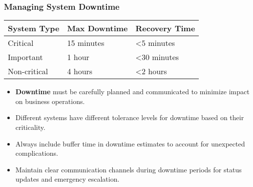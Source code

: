 \documentclass{beamer}
\begin{document}
            \begin{frame}
            \frametitle{Managing System Downtime}
            \begin{table}
            \begin{tabular}{lll}
            \toprule
            \textbf{System Type} & \textbf{Max Downtime} & \textbf{Recovery Time} \\
            \midrule
            Critical & 15 minutes & \textless 5 minutes \\
            Important & 1 hour & \textless 30 minutes \\
            Non-critical & 4 hours & \textless 2 hours \\
            \bottomrule
            \end{tabular}
            \end{table}
            \begin{itemize}
                \item \textbf{Downtime} must be carefully planned and communicated to minimize impact on business operations.
                
                \item Different systems have different tolerance levels for downtime based on their criticality.
                
                \item Always include buffer time in downtime estimates to account for unexpected complications.
                
                \item Maintain clear communication channels during downtime periods for status updates and emergency escalation.
            \end{itemize}
            \end{frame}
\end{document}
